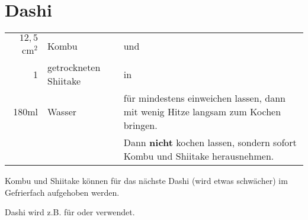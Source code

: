 \section{Dashi}\label{sec:dashi}
\begin{longtable}{rlL{15.25cm}}
	$12,5$cm$^2$	&	Kombu					&	und	\\
	1				&	getrockneten Shiitake	&	in	\\
	180ml			&	Wasser					&	für mindestens  einweichen lassen, dann mit wenig Hitze langsam zum Kochen bringen. \\
					&							&	Dann \textbf{nicht} kochen lassen, sondern sofort Kombu und Shiitake herausnehmen.
\end{longtable}

Kombu und Shiitake können für das nächste Dashi (wird etwas schwächer) im Gefrierfach aufgehoben werden.

Dashi wird z.B. für  oder  verwendet.